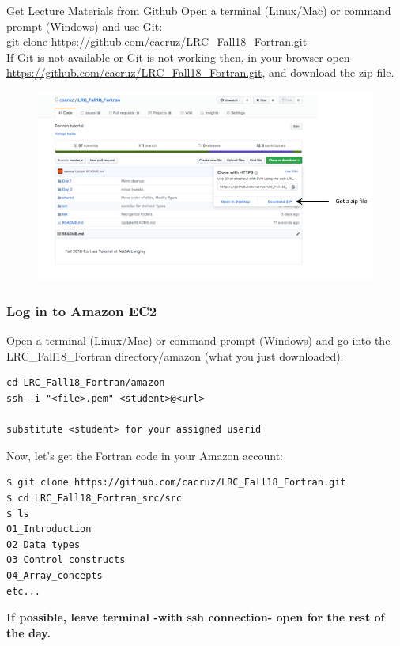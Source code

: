\documentclass[11pt]{beamer}
\begin{document}
\begin{frame}{Get Lecture Materials from Github}
\footnotesize{Open a terminal (Linux/Mac) or command prompt (Windows) and use Git:\\}
\footnotesize{\quad git clone \url{https://github.com/cacruz/LRC_Fall18_Fortran.git}}\\
\vspace{5mm}
If Git is not available or Git is not working then, in your browser open \url{https://github.com/cacruz/LRC_Fall18_Fortran.git}, and download the zip file.
\begin{figure}[t]
\centering
\includegraphics[scale=.25]{../../shared/github_zip}
\end{figure}

\end{frame}


\begin{frame}[fragile]
\frametitle{Log in to Amazon EC2}

\footnotesize{Open a terminal (Linux/Mac) or command prompt (Windows) and go into the LRC\_Fall18\_Fortran directory/amazon (what you just downloaded):}

\scriptsize{
\begin{Verbatim} 
cd LRC_Fall18_Fortran/amazon
ssh -i "<file>.pem" <student>@<url>

substitute <student> for your assigned userid
\end{Verbatim}
}
\footnotesize{Now, let's get the Fortran code in your Amazon account:}
\scriptsize{
\begin{Verbatim} 
$ git clone https://github.com/cacruz/LRC_Fall18_Fortran.git
$ cd LRC_Fall18_Fortran_src/src
$ ls
01_Introduction
02_Data_types
03_Control_constructs
04_Array_concepts
etc...
\end{Verbatim}
}
\begin{center}
\textbf{If possible, leave terminal -with ssh connection- open for the rest of the day.}
\end{center}
\end{frame}
\end{document}
